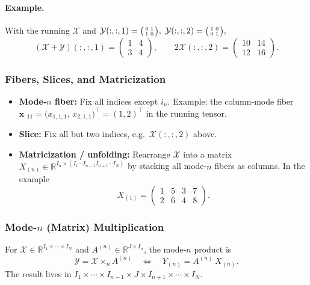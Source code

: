 \paragraph{Example.}
With the running $\mathcal{X}$ and
\(
\mathcal{Y}(:,:,1)=\bigl(\small\begin{smallmatrix}0&1\\1&0\end{smallmatrix}\bigr),
\;
\mathcal{Y}(:,:,2)=\bigl(\small\begin{smallmatrix}1&0\\0&1\end{smallmatrix}\bigr),
\)
\[
(\mathcal{X}+\mathcal{Y})(:,:,1)=
\begin{pmatrix}1&4\\3&4\end{pmatrix},\qquad
2\mathcal{X}(:,:,2)=
\begin{pmatrix}10&14\\12&16\end{pmatrix}.
\]

\subsubsection{Fibers, Slices, and Matricization}
\begin{itemize}
\item \textbf{Mode‑$n$ fiber:}
  Fix all indices except $i_n$.  
  Example: the column‐mode fiber
  $\mathbf{x}_{:11}=\bigl(x_{1,1,1},\,x_{2,1,1}\bigr)^\top
  =(1,2)^\top$ in the running tensor.
\item \textbf{Slice:}  Fix all but two indices, e.g.\  
  $\mathcal{X}(:,:,2)$ above.
\item \textbf{Matricization / unfolding:}
  Rearrange $\mathcal{X}$ into a matrix $X_{(n)}\in\mathbb{R}^{I_n\times(I_1\cdots I_{n-1}I_{n+1}\cdots I_N)}$
  by stacking all mode‑$n$ fibers as columns.  
  In the example
  \[
    X_{(1)}=
    \begin{pmatrix}
      1 & 5 & 3 & 7 \\
      2 & 6 & 4 & 8
    \end{pmatrix}.
  \]
\end{itemize}

\subsubsection{Mode‑$n$ (Matrix) Multiplication}
For
$\mathcal{X}\in\mathbb{R}^{I_1\times\cdots\times I_N}$
and
$A^{(n)}\in\mathbb{R}^{J\times I_n}$,
the mode‑$n$ product is
\[
  \mathcal{Y}=\mathcal{X}\times_n A^{(n)}
  \quad\Longleftrightarrow\quad
  Y_{(n)}=A^{(n)}\,X_{(n)}.
\]
The result lives in
$I_1\times\cdots\times I_{n-1}\times J\times I_{n+1}\times\cdots\times I_N$.

